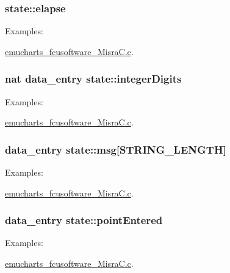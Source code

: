\subsubsection[{\texorpdfstring{elapse}{elapse}}]{ state\+::elapse}\hypertarget{structstate_ae0c79ae121fc470f945cc03b29c2ab0b}{}\label{structstate_ae0c79ae121fc470f945cc03b29c2ab0b}
\begin{Desc}
\item[Examples\+: ]\par
\hyperlink{emucharts_fcusoftware__misra_c_8c-example}{emucharts\+\_\+fcusoftware\+\_\+\+Misra\+C.\+c}.\end{Desc}
\subsubsection[{\texorpdfstring{integer\+Digits}{integerDigits}}]{\setlength{\rightskip}{0pt plus 5cm}nat data\+\_\+entry state\+::integer\+Digits}\hypertarget{structstate_a267c146c9bfe2a7e0cdf36d8d50e9a7e}{}\label{structstate_a267c146c9bfe2a7e0cdf36d8d50e9a7e}
\begin{Desc}
\item[Examples\+: ]\par
\hyperlink{emucharts_fcusoftware__misra_c_8c-example}{emucharts\+\_\+fcusoftware\+\_\+\+Misra\+C.\+c}.\end{Desc}
\subsubsection[{\texorpdfstring{msg}{msg}}]{ data\+\_\+entry state\+::msg\mbox{[}{\bf S\+T\+R\+I\+N\+G\+\_\+\+L\+E\+N\+G\+TH}\mbox{]}}\hypertarget{structstate_a685a2a1db0b7be88bb2bd7ede1488b3e}{}\label{structstate_a685a2a1db0b7be88bb2bd7ede1488b3e}
\begin{Desc}
\item[Examples\+: ]\par
\hyperlink{emucharts_fcusoftware__misra_c_8c-example}{emucharts\+\_\+fcusoftware\+\_\+\+Misra\+C.\+c}.\end{Desc}
\subsubsection[{\texorpdfstring{point\+Entered}{pointEntered}}]{ data\+\_\+entry state\+::point\+Entered}\hypertarget{structstate_a1754500336f1e552a7345dedc8d26a7e}{}\label{structstate_a1754500336f1e552a7345dedc8d26a7e}
\begin{Desc}
\item[Examples\+: ]\par
\hyperlink{emucharts_fcusoftware__misra_c_8c-example}{emucharts\+\_\+fcusoftware\+\_\+\+Misra\+C.\+c}.\end{Desc}
